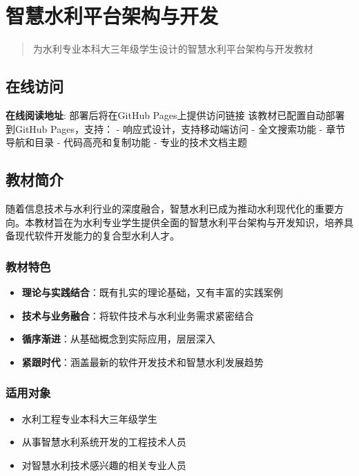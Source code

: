 \section{智慧水利平台架构与开发}\label{ux667aux6167ux6c34ux5229ux5e73ux53f0ux67b6ux6784ux4e0eux5f00ux53d1} \begin{quote}
为水利专业本科大三年级学生设计的智慧水利平台架构与开发教材 \end{quote} \subsection{在线访问}\label{ux5728ux7ebfux8bbfux95ee} \textbf{在线阅读地址}: 部署后将在GitHub
Pages上提供访问链接 该教材已配置自动部署到GitHub Pages，支持： - 响应式设计，支持移动端访问 - 全文搜索功能 - 章节导航和目录 - 代码高亮和复制功能 - 专业的技术文档主题
\subsection{教材简介}\label{ux6559ux6750ux7b80ux4ecb}
随着信息技术与水利行业的深度融合，智慧水利已成为推动水利现代化的重要方向。本教材旨在为水利专业学生提供全面的智慧水利平台架构与开发知识，培养具备现代软件开发能力的复合型水利人才。
\subsubsection{教材特色}\label{ux6559ux6750ux7279ux8272} \begin{itemize} \tightlist \item
\textbf{理论与实践结合}：既有扎实的理论基础，又有丰富的实践案例 \item \textbf{技术与业务融合}：将软件技术与水利业务需求紧密结合 \item \textbf{循序渐进}：从基础概念到实际应用，层层深入 \item
\textbf{紧跟时代}：涵盖最新的软件开发技术和智慧水利发展趋势 \end{itemize} \subsubsection{适用对象}\label{ux9002ux7528ux5bf9ux8c61} \begin{itemize}
\tightlist \item 水利工程专业本科大三年级学生 \item 从事智慧水利系统开发的工程技术人员 \item 对智慧水利技术感兴趣的相关专业人员 \end{itemize} \section{}\label{section}

